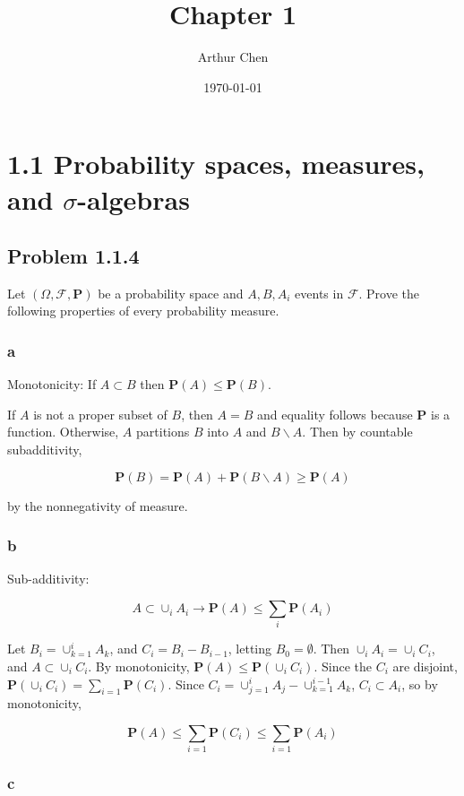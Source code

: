 \documentclass{article}
\author{Arthur Chen}
\title{Chapter 1}
\date{\today}
\newcommand{\F}{\mathcal{F}}
\newcommand{\prob}{\boldsymbol{P}}
\begin{document}
\maketitle

\section*{1.1 Probability spaces, measures, and $\sigma$-algebras}

\subsection*{Problem 1.1.4}

Let $(\Omega, \F, \prob)$ be a probability space and $A, B, A_i$ events in $\F$. Prove the following properties of every probability measure.

\subsubsection*{a}

Monotonicity: If $A \subset B$ then $\prob(A) \leq \prob(B)$.

If $A$ is not a proper subset of $B$, then $A=B$ and equality follows because $\prob$ is a function. Otherwise, $A$ partitions $B$ into $A$ and $B \backslash A$. Then by countable subadditivity,

\[
\prob(B) = \prob(A) + \prob(B \backslash A) \geq \prob(A)
\]

by the nonnegativity of measure.

\subsubsection*{b}

Sub-additivity:

\[
A \subset \cup_i A_i \longrightarrow \prob(A) \leq \sum_i \prob(A_i)
\]

Let $B_i = \cup_{k=1}^i A_k$, and $C_i = B_i - B_{i-1}$, letting $B_0 = \emptyset$. Then $\cup_i A_i = \cup_i C_i$, and $A \subset \cup_i C_i$. By monotonicity, $\prob(A) \leq \prob(\cup_i C_i)$. Since the $C_i$ are disjoint, $\prob(\cup_i C_i) = \sum_{i=1} \prob(C_i)$. Since $C_i = \cup_{j=1}^i A_j - \cup_{k=1}^{i-1}A_k$, $C_i \subset A_i$, so by monotonicity,

\[
\prob(A) \leq \sum_{i=1} \prob(C_i) \leq \sum_{i=1} \prob(A_i)
\]

\subsubsection*{c}
\end{document}
